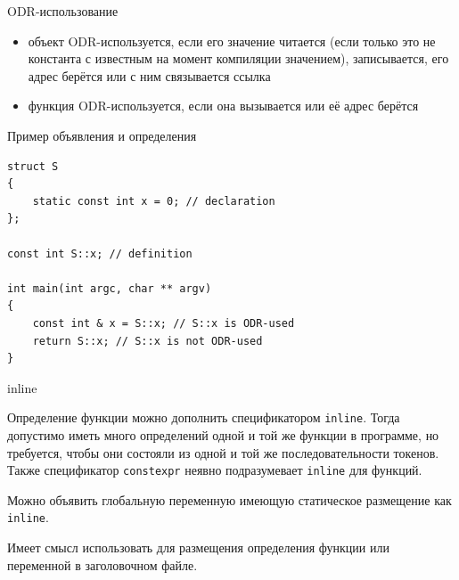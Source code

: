 \documentclass[unknownkeysallowed,xcolor=table]{beamer}
\begin{document}
\begin{frame}{ODR-использование}

\begin{itemize}
  \item объект ODR-используется, если его значение читается (если только это не константа с известным на момент компиляции значением), записывается, его адрес берётся или с ним связывается ссылка \vspace{2em}
  \item функция ODR-используется, если она вызывается или её адрес берётся
\end{itemize}

\end{frame}

\begin{frame}[fragile]{Пример объявления и определения}

\begin{lstlisting}
struct S
{
    static const int x = 0; // declaration
};

const int S::x; // definition

int main(int argc, char ** argv)
{
    const int & x = S::x; // S::x is ODR-used
    return S::x; // S::x is not ODR-used
}
\end{lstlisting}

\end{frame}

\begin{frame}{inline}

Определение функции можно дополнить спецификатором \lstinline{inline}. Тогда допустимо иметь много определений одной и той же функции в программе, но требуется, чтобы они состояли из одной и той же последовательности токенов. Также спецификатор \lstinline{constexpr} неявно подразумевает \lstinline{inline} для функций.

\vspace{1em}

Можно объявить глобальную переменную имеющую статическое размещение как \lstinline{inline}.

\vspace{2em}

Имеет смысл использовать для размещения определения функции или переменной в заголовочном файле.

\end{frame}
\end{document}
